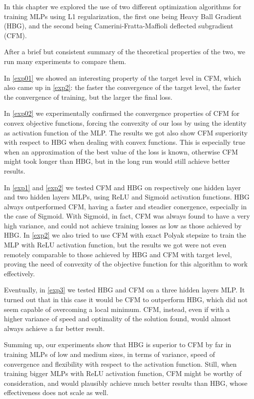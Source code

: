 In this chapter we explored the use of two different optimization algorithms for training MLPs using L1 regularization, the first one being Heavy Ball Gradient (HBG), and the second being Camerini-Fratta-Maffioli deflected subgradient (CFM).  

After a brief but consistent summary of the theoretical properties of the two, we run many experiments to compare them.

In \ref{exp01} we showed an interesting property of the target level in CFM, which also came up in \ref{exp2}: the faster the convergence of the target level, the faster the convergence of training, but the larger the final loss.

In \ref{exp02} we experimentally confirmed the convergence properties of CFM for convex objective functions, forcing the convexity of our loss by using the identity as activation function of the MLP. The results we got also show CFM superiority with respect to HBG when dealing with convex functions. This is especially true when an approximation of the best value of the loss is known, otherwise CFM might took longer than HBG, but in the long run would still achieve better results.

In \ref{exp1} and \ref{exp2} we tested CFM and HBG on respectively one hidden layer and two hidden layers MLPs, using ReLU and Sigmoid activation functions. HBG always outperformed CFM, having a faster and steadier conergence, especially in the case of Sigmoid. With Sigmoid, in fact, CFM was always found to have a very high variance, and could not achieve training losses as low as those achieved by HBG. In \ref{exp2} we also tried to use CFM with exact Polyak stepsize to train the MLP with ReLU activation function, but the results we got were not even remotely comparable to those achieved by HBG and CFM with target level, proving the need of convexity of the objective function for this algorithm to work effectively.

Eventually, in \ref{exp3} we tested HBG and CFM on a three hidden layers MLP. It turned out that in this case it would be CFM to outperform HBG, which did not seem capable of overcoming a local minimum. CFM, instead, even if with a higher variance of speed and optimality of the solution found, would almost always achieve a far better result.

Summing up, our experiments show that HBG is superior to CFM by far in training MLPs of low and medium sizes, in terms of variance, speed of convergence and flexibility with respect to the activation function. Still, when training bigger MLPs with ReLU activation function, CFM might be worthy of consideration, and would plausibly achieve much better results than HBG, whose effectiveness does not scale as well.